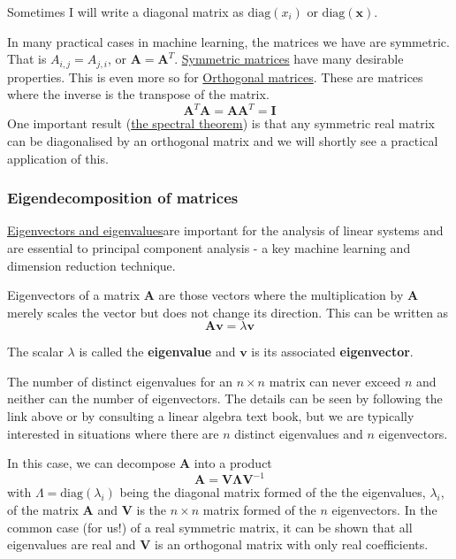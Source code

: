 \documentclass[a4paper,10pt]{article}
\newcommand{\link}[2]{{\color{blue}\href{#1}{#2}}}
\begin{document}
Sometimes I will write a diagonal matrix as $\mathrm{diag}(x_i)$ or $\mathrm{diag}(\mathbf{x})$. 


In many practical cases in machine learning, the matrices we have are symmetric. That is $A_{i,j} = A_{j, i}$, or $\mathbf{A}=\mathbf{A}^T$. \link{https://en.wikipedia.org/wiki/Symmetric_matrix}{Symmetric matrices} have many desirable properties. This is even more so for \link{https://en.wikipedia.org/wiki/Orthogonal_matrix}{Orthogonal matrices}. These are matrices where the inverse is the transpose of the matrix.
$$\mathbf{A}^T \mathbf{A} = \mathbf{A}\mathbf{A}^T = \mathbf{I}$$
One important result (\link{https://en.wikipedia.org/wiki/Spectral_theorem}{the spectral theorem}) is that any symmetric real matrix can be diagonalised by an orthogonal matrix and we will shortly see a practical application of this.

\subsubsection{ Eigendecomposition of matrices}

\link{https://en.wikipedia.org/wiki/Eigenvalues_and_eigenvectors}{Eigenvectors and eigenvalues}are important for the analysis of linear systems and are essential to principal component analysis - a key machine learning and dimension reduction technique.

Eigenvectors of a matrix $\mathbf{A}$ are those vectors where the multiplication by $\mathbf{A}$ merely scales the vector but does not change its direction. This can be written as
$$\mathbf{A}\mathbf{v} = \lambda \mathbf{v}$$

The scalar $\lambda$ is called the \textbf{eigenvalue} and $\mathbf{v}$ is its associated \textbf{eigenvector}.

The number of distinct eigenvalues for an $n\times n$ matrix can never exceed $n$ and neither can the number of eigenvectors. The details can be seen by following the link above or by consulting a linear algebra text book, but we are typically interested in situations where there are $n$ distinct eigenvalues and $n$ eigenvectors.

In this case, we can decompose $\mathbf{A}$ into a product
$$\mathbf{A} = \mathbf{V} \bm{\Lambda} \mathbf{V}^{-1}$$ with $\Lambda=\mathrm{diag}(\lambda_i)$ being the diagonal matrix formed of the the eigenvalues, $\lambda_i$, of the matrix $\mathbf{A}$ and $\mathbf{V}$ is the $n\times n$ matrix formed of the $n$ eigenvectors. In the common case (for us!) of a real symmetric matrix, it can be shown that all eigenvalues are real and  $\mathbf{V}$ is an orthogonal matrix with only real coefficients.
\end{document}

